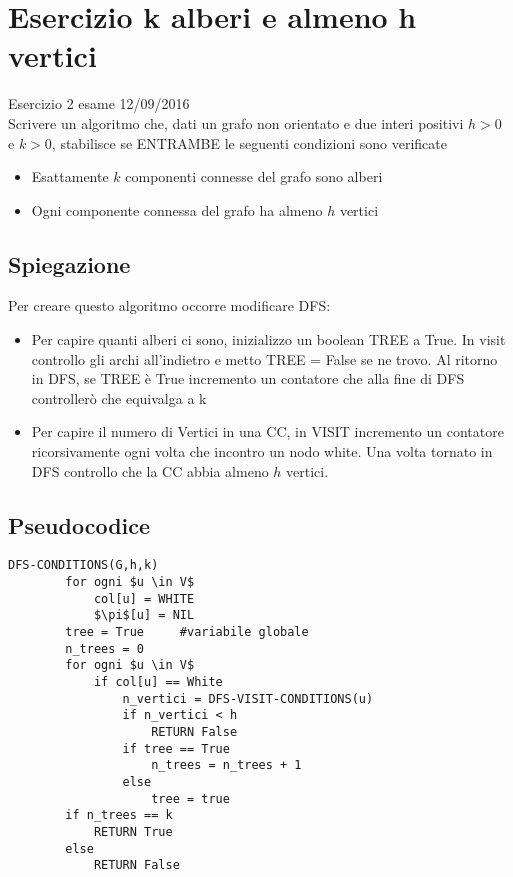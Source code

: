 \documentclass[12pt, a4paper, openany]{book}
\begin{document}
    \section{Esercizio k alberi e almeno h vertici} Esercizio 2 esame 12/09/2016\\
    Scrivere un algoritmo che, dati un grafo non orientato e due interi positivi $h>0$ e $k>0$, stabilisce se ENTRAMBE le seguenti condizioni sono verificate
    \begin{itemize}
        \item Esattamente $k$ componenti connesse del grafo sono alberi
        \item Ogni componente connessa del grafo ha almeno $h$ vertici
    \end{itemize}

    \subsection*{Spiegazione}
    Per creare questo algoritmo occorre modificare DFS:
    \begin{itemize}
        \item Per capire quanti alberi ci sono, inizializzo un boolean TREE a True. In visit controllo gli archi all'indietro e metto TREE = False se ne trovo. Al ritorno in DFS, se TREE è True incremento un contatore che alla fine di DFS controllerò che equivalga a k
        \item Per capire il numero di Vertici in una CC, in VISIT incremento un contatore ricorsivamente ogni volta che incontro un nodo white. Una volta tornato in DFS controllo che la CC abbia almeno $h$ vertici.
    \end{itemize}

    \subsection*{Pseudocodice}
    \begin{lstlisting}[mathescape=true]
    DFS-CONDITIONS(G,h,k)
        for ogni $u \in V$
            col[u] = WHITE
            $\pi$[u] = NIL
        tree = True     #variabile globale
        n_trees = 0
        for ogni $u \in V$
            if col[u] == White
                n_vertici = DFS-VISIT-CONDITIONS(u)
                if n_vertici < h
                    RETURN False
                if tree == True
                    n_trees = n_trees + 1
                else
                    tree = true
        if n_trees == k
            RETURN True
        else
            RETURN False
    \end{lstlisting}
\end{document}
